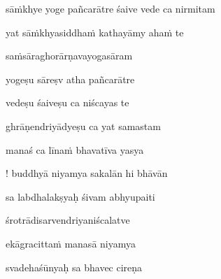 sā\.mkhye yoge pañcarātre śaive vede ca nirmitam \veg\dontdisplaylinenum

\ujvers\nemsloka 
yat sā\.mkhyasiddha\.m kathayāmy aha\.m te
\dontdisplaylinenum

\nemslokab 
sa\.msāraghorārṇavayogasāram \danda\dontdisplaylinenum

\nemslokac 
yogeṣu sāreṣv atha pañcarātre
\dontdisplaylinenum

\nemslokad 
vedeṣu śaiveṣu ca niścayas te \veg\dontdisplaylinenum

\ujvers\nemsloka 
ghrāṇendriyādyeṣu ca yat samastam
\dontdisplaylinenum

\nemslokab 
manaś ca līna\.m bhavatīva yasya \danda\dontdisplaylinenum

\nemslokac 
! buddhyā niyamya sakalān hi bhāvān
\dontdisplaylinenum

\nemslokad 
sa labdhalakṣyaḥ śivam abhyupaiti \veg\dontdisplaylinenum

\ujvers\nemsloka 
śrotrādisarvendriyaniścalatve
\dontdisplaylinenum

\nemslokab 
ekāgracitta\.m manasā niyamya \danda\dontdisplaylinenum

\nemslokac 
svadehaśūnyaḥ sa bhavec cireṇa
\dontdisplaylinenum

